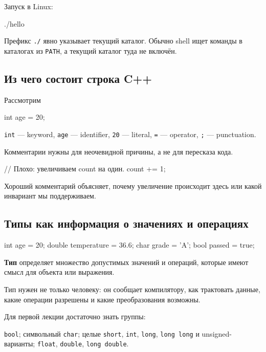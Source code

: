 Запуск в Linux:

\begin{shellcode}
./hello
\end{shellcode}

Префикс \texttt{./} явно указывает текущий каталог. Обычно shell ищет команды
в каталогах из \texttt{PATH}, а текущий каталог туда не включён.

\subsection{Из чего состоит строка C++}

Рассмотрим

\begin{cppcodeplain}
int age = 20;
\end{cppcodeplain}

\texttt{int} --- keyword, \texttt{age} --- identifier,
\texttt{20} --- literal, \texttt{=} --- operator,
\texttt{;} --- punctuation.

Комментарии нужны для неочевидной причины, а не для пересказа кода.

\begin{cppcodeplain}
// Плохо: увеличиваем count на один.
count += 1;
\end{cppcodeplain}

Хороший комментарий объясняет, почему увеличение происходит здесь или какой
инвариант мы поддерживаем.

\subsection{Типы как информация о значениях и операциях}

\begin{cppcode}
int age = 20;
double temperature = 36.6;
char grade = 'A';
bool passed = true;
\end{cppcode}

\begin{definition}
\textbf{Тип} определяет множество допустимых значений и операций, которые
имеют смысл для объекта или выражения.
\end{definition}

Тип нужен не только человеку: он сообщает компилятору, как трактовать данные,
какие операции разрешены и какие преобразования возможны.

Для первой лекции достаточно знать группы:

\texttt{bool}; символьный \texttt{char}; целые \texttt{short}, \texttt{int}, \texttt{long}, \texttt{long long} и unsigned-варианты; \texttt{float}, \texttt{double}, \texttt{long double}.

